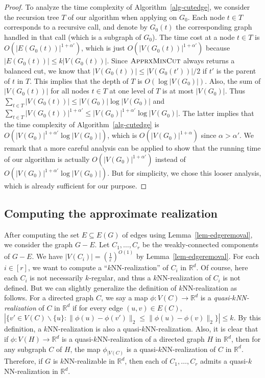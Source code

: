 \documentclass[11pt]{article}
\begin{document}
\begin{proof}
To analyze the time complexity of Algorithm~\ref{alg-cutedge}, we consider the recursion tree $T$ of our algorithm when applying on $G_0$.
Each node $t \in T$ corresponds to a recursive call, and denote by $G_0(t)$ the corresponding graph handled in that call (which is a subgraph of $G_0$).
The time cost at a node $t \in T$ is $O(|E(G_0(t))|^{1+\alpha'})$, which is just $O(|V(G_0(t))|^{1+\alpha'})$ because $|E(G_0(t))| \leq k|V(G_0(t))|$.
Since $\textsc{ApprxMinCut}$ always returns a balanced cut, we know that $|V(G_0(t))| \leq |V(G_0(t'))|/2$ if $t'$ is the parent of $t$ in $T$.
This implies that the depth of $T$ is $O(\log |V(G_0)|)$.
Also, the sum of $|V(G_0(t))|$ for all nodes $t \in T$ at one level of $T$ is at most $|V(G_0)|$.
Thus $\sum_{t \in T} |V(G_0(t))| \leq |V(G_0)| \log |V(G_0)|$ and $\sum_{t \in T} |V(G_0(t))|^{1+\alpha'} \leq |V(G_0)|^{1+\alpha'} \log |V(G_0)|$.
The latter implies that the time complexity of Algorithm~\ref{alg-cutedge} is $O(|V(G_0)|^{1+\alpha'} \log |V(G_0)|)$, which is $O(|V(G_0)|^{1+\alpha})$ since $\alpha > \alpha'$.
We remark that a more careful analysis can be applied to show that the running time of our algorithm is actually $O(|V(G_0)|^{1+\alpha'})$ instead of $O(|V(G_0)|^{1+\alpha'} \log |V(G_0)|)$.
But for simplicity, we chose this looser analysis, which is already sufficient for our purpose.
\end{proof}

\subsection{Computing the approximate realization} \label{sec-component}

After computing the set $E \subseteq E(G)$ of edges using Lemma~\ref{lem-edgeremoval}, we consider the graph $G - E$.
Let $C_1,\dots,C_r$ be the weakly-connected components of $G - E$.
We have $|V(C_i)| = (\frac{1}{\varepsilon})^{O(1)}$ by Lemma~\ref{lem-edgeremoval}.
For each $i \in [r]$, we want to compute a ``$k$NN-realization'' of $C_i$ in $\mathbb{R}^d$.
Of course, here each $C_i$ is not necessarily $k$-regular, and thus a $k$NN-realization of $C_i$ is not defined.
But we can slightly generalize the definition of $k$NN-realization as follows.
For a directed graph $C$, we say a map $\phi: V(C) \rightarrow \mathbb{R}^d$ is a \textit{quasi-$k$NN-realization} of $C$ in $\mathbb{R}^d$ if for every edge $(u,v) \in E(C)$, $|\{v' \in V(C) \backslash \{u\}: \lVert \phi(u) - \phi(v') \rVert_2 \leq \lVert \phi(u) - \phi(v) \rVert_2\}| \leq k$.
By this definition, a $k$NN-realization is also a quasi-$k$NN-realization.
Also, it is clear that if $\phi:V(H) \rightarrow \mathbb{R}^d$ is a quasi-$k$NN-realization of a directed graph $H$ in $\mathbb{R}^d$, then for any subgraph $C$ of $H$, the map $\phi_{|V(C)}$ is a quasi-$k$NN-realization of $C$ in $\mathbb{R}^d$.
Therefore, if $G$ is $k$NN-realizable in $\mathbb{R}^d$, then each of $C_1,\dots,C_r$ admits a quasi-$k$NN-realization in $\mathbb{R}^d$.
\end{document}
